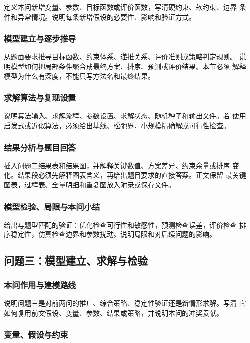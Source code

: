 \documentclass[12pt,a4paper]{ctexart}
\begin{document}
定义本问新增变量、参数、目标函数或评价函数，写清硬约束、软约束、边界
条件和异常情况。说明每条新增假设的必要性、影响和验证方式。

\subsubsection{模型建立与逐步推导}

从题面要求推导目标函数、约束体系、递推关系、评价准则或策略判定规则。
说明模型如何把局部条件聚合成最终方案、排序、预测或评价结果。本节必须
解释模型为什么有深度，不能只写方法名和最终结果。

\subsubsection{求解算法与复现设置}

说明算法输入、求解流程、参数设置、求解状态、随机种子和输出文件。若
使用启发式或近似算法，必须给出基线、松弛界、小规模精确解或可行性检查。

\subsubsection{结果分析与题目回答}

插入问题二结果表和结果图，并解释关键数值、方案差异、约束余量或排序
变化。结果段必须先解释图表含义，再给出题目要求的直接答案。正文保留
最关键图表，过程表、全量明细和重复图放入附录或保存文件。

\subsubsection{模型检验、局限与本问小结}

给出与题型匹配的验证：优化检查可行性和敏感性，预测检查误差，评价检查
排序稳定性，仿真检查边界和参数扰动。说明局限和对后续问题的影响。

\subsection{问题三：模型建立、求解与检验}

\subsubsection{本问作用与建模路线}

说明问题三是对前两问的推广、综合策略、稳定性验证还是新情形求解。写清
它如何复用前文假设、变量、参数、结果或策略，并说明本问的冲奖贡献。

\subsubsection{变量、假设与约束}
\end{document}
